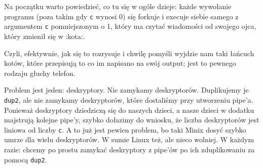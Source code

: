 Na początku warto powiedzieć, co tu się w ogóle dzieje: każde wywołanie programu (poza takim gdy \texttt{c} wynosi 0) się forkuje i execuje siebie samego z argumentem \texttt{c} pomniejszonym o 1, który ma czytać wiadomości od swojego ojca, który zmienił się w :kota:.

Czyli, efektywnie, jak się to rozrysuje i chwilę pomyśli wyjdzie nam taki łańcuch kotów, które przepisują to co im napisano na swój output; jest to pewnego rodzaju głuchy telefon.

Problem jest jeden: deskryptory. Nie zamykamy deskryptorów. Duplikujemy je \texttt{dup2}, ale nie zamykamy deskryptorów, które dostaliśmy przy utworzeniu pipe'a. Ponieważ deskryptory dziedziczą się do naszych dzieci, a nasze dzieci w dodatku majstrują kolejne pipe'y, szybko dołazimy do wniosku, że liczba deskryptorów jest liniowa od liczby \texttt{c}. A to już jest pewien problem, bo taki Minix dosyć szybko umrze dla wielu deskryptorów. W sumie Linux też, ale nieco wolniej. W każdym razie: chcemy po prostu zamykać deskryptory z pipe'ów po ich zduplikowaniu za pomocą \texttt{dup2}.
